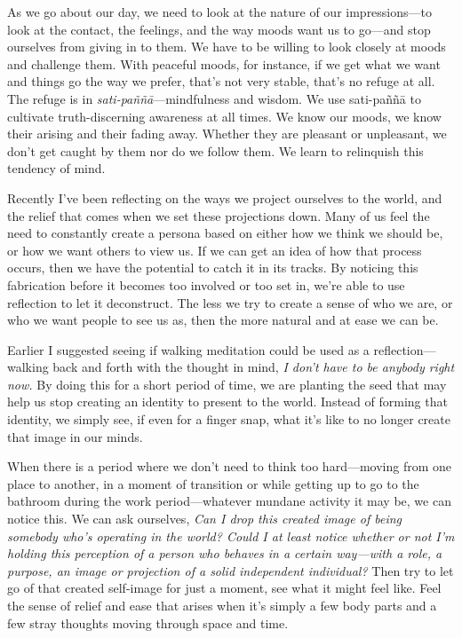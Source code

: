 As we go about our day, we need to look at the nature of our 
impressions---to look at the contact, the feelings, and the way moods 
want us to go---and stop ourselves from giving in to them. We have to 
be willing to look closely at moods and challenge them. With peaceful 
moods, for instance, if we get what we want and things go the way we 
prefer, that's not very stable, that's no refuge at all. The refuge is 
in \emph{sati-paññā}---mindfulness and wisdom. We use sati-paññā 
to cultivate truth-discerning awareness at all times. We know our 
moods, we know their arising and their fading away. Whether they are 
pleasant or \mbox{unpleasant,} we don't get caught by them nor do we follow 
them. We learn to relinquish this tendency of mind.


Recently I've been reflecting on the ways we project ourselves to the 
world, and the relief that comes when we set these projections down. 
Many of us feel the need to constantly create a persona based on either 
how we think we should be, or how we want others to view us. If we can 
get an idea of how that process occurs, then we have the potential to 
catch it in its tracks. By noticing this fabrication before it becomes 
too involved or too set in, we're able to use reflection to let it 
deconstruct. The less we try to create a sense of who we are, or who we 
want people to see us as, then the more natural and at ease we can be.

Earlier I suggested seeing if walking meditation could be used as a 
reflection---walking back and forth with the thought in mind, \emph{I 
don't have to be anybody right now.} By doing this for a short period 
of time, we are planting the seed that may help us stop creating an 
identity to present to the world. Instead of forming that identity, we 
simply see, if even for a finger snap, what it's like to no longer 
create that image in our minds.

When there is a period where we don't need to think too hard---moving 
from one place to another, in a moment of transition or while getting 
up to go to the bathroom during the work period---whatever mundane 
activity it may be, we can notice this. We can ask ourselves, \emph{Can 
I drop this created image of being somebody who's operating in the 
world? Could I at least notice whether or not I'm holding this 
perception of a person who behaves in a certain way---with a role, a 
purpose, an image or projection of a solid independent individual?} 
Then try to let go of that created self-image for just a moment, see 
what it might feel like. Feel the sense of relief and ease that arises 
when it's simply a few body parts and a few stray thoughts moving 
through space and time.


